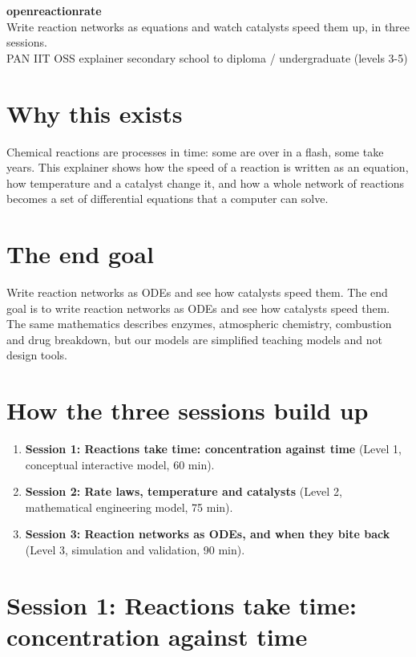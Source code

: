 \documentclass[11pt,a4paper]{article}
\begin{document}
\begin{center}{\LARGE\bfseries openreactionrate}\\[0.4em]{\large Write reaction networks as equations and watch catalysts speed them up, in three sessions.}\\[0.2em]\small PAN IIT OSS explainer \textbullet{} secondary school to diploma / undergraduate (levels 3-5)\end{center}

\section*{Why this exists}
Chemical reactions are processes in time: some are over in a flash, some take years. This explainer shows how the speed of a reaction is written as an equation, how temperature and a catalyst change it, and how a whole network of reactions becomes a set of differential equations that a computer can solve.

\section*{The end goal}
Write reaction networks as ODEs and see how catalysts speed them. The end goal is to write reaction networks as ODEs and see how catalysts speed them. The same mathematics describes enzymes, atmospheric chemistry, combustion and drug breakdown, but our models are simplified teaching models and not design tools.

\section*{How the three sessions build up}
\begin{enumerate}[nosep]
\item \textbf{Session 1: Reactions take time: concentration against time} (Level 1, conceptual interactive model, 60 min).
\item \textbf{Session 2: Rate laws, temperature and catalysts} (Level 2, mathematical engineering model, 75 min).
\item \textbf{Session 3: Reaction networks as ODEs, and when they bite back} (Level 3, simulation and validation, 90 min).
\end{enumerate}

\section{Session 1: Reactions take time: concentration against time}
\end{document}
